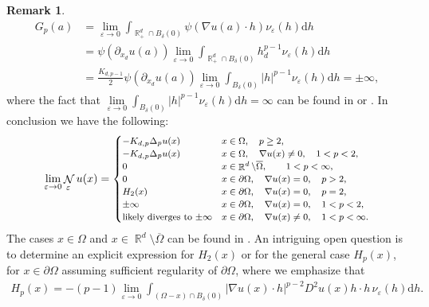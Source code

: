 \documentclass[12pt, reqno]{amsart}%
\theoremstyle{plain}  %
\theoremstyle{definition}  %
\newtheorem{remark}[theorem]{Remark}   %
\numberwithin{equation}{section}
\DeclareMathOperator{\cN}{\mathcal{N}}
\DeclareMathOperator{\R}{\mathbb{R}}
\renewcommand{\d}{\mathrm{d}}
\newcommand{\eps}{\varepsilon}
\begin{document}
\begin{remark}
\begin{align*}
G_p(a)&=  \lim_{\eps\to0} \int_{\R^d_+\cap B_\delta(0)} \psi(\nabla u(a)\cdot h)\nu_\eps( h)\d h\\
&= \psi(\partial_{x_d} u(a))  \lim_{\eps\to0} \int_{\R^d_+\cap B_\delta(0)} h_d^{p-1}\nu_\eps( h)\d h\\
&= \frac{K_{d,p-1}}{2}\psi(\partial_{x_d} u(a))  \lim_{\eps\to0} \int_{B_\delta(0)} |h|^{p-1}\nu_\eps( h)\d h=\pm\infty,
\end{align*}
where the fact that $\lim\limits_{\eps\to0} \int_{B_\delta(0)} |h|^{p-1}\nu_\eps( h)\d h=\infty$ can be found in  \cite[Proposition 9.1]{Fog25} or \cite[Remark 2.3]{Fog23}.   In conclusion we have the following:
\begin{align*}
\footnotesize
\lim_{\eps\to0} \cN_\eps u (x)=
\begin{cases}
-K_{d,p}\Delta_p u(x)  &x\in \Omega,\quad   p\geq 2,\\
-K_{d,p}\Delta_p u(x)  &x\in \Omega,\quad \nabla u(x)\neq 0, \quad1<p<2,\\
0 & x\in \R^d\setminus \overline{\Omega},\qquad 1<p<\infty,\\
0&x\in \partial \Omega,\quad \nabla u(x)=0, \quad p>2,\\
H_2(x) &x\in \partial \Omega,\quad \nabla u(x)=0, \quad p=2,\\
\pm \infty &x\in \partial \Omega,\quad \nabla u(x)=0, \quad 1<p<2,\\
\text{likely diverges to $\pm\infty$} & x\in \partial \Omega,\quad \nabla u(x)\neq 0,\quad 1<p<\infty.
\end{cases}
\end{align*}
The cases $x\in \Omega$ and $x\in \R^d\setminus\overline{\Omega}$ can be found in \cite[Section 9]{Fog25}.
An intriguing open question is to determine an explicit expression for $H_2(x)$ or for the general case $H_p(x)$, for  $x\in \partial\Omega$ assuming sufficient regularity  of
$\partial\Omega$, where we emphasize that
\begin{align*}
H_p(x)=-(p-1)\lim_{\eps\to0} \int_{(\Omega-x)\cap B_\delta(0)}
|\nabla u(x)\cdot h|^{p-2}D^2 u(x)h\cdot h  \,\nu_\eps(h)\d h.
\end{align*}
\end{remark}
\end{document}
